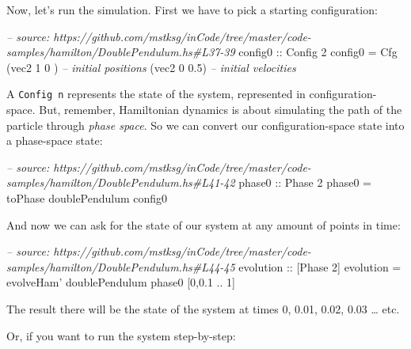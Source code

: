 \documentclass[]{article}
\newenvironment{Shaded}{}{}
\newcommand{\DataTypeTok}[1]{\textcolor[rgb]{0.56,0.13,0.00}{{#1}}}
\newcommand{\DecValTok}[1]{\textcolor[rgb]{0.25,0.63,0.44}{{#1}}}
\newcommand{\FloatTok}[1]{\textcolor[rgb]{0.25,0.63,0.44}{{#1}}}
\newcommand{\CommentTok}[1]{\textcolor[rgb]{0.38,0.63,0.69}{\textit{{#1}}}}
\newcommand{\OtherTok}[1]{\textcolor[rgb]{0.00,0.44,0.13}{{#1}}}
\newcommand{\FunctionTok}[1]{\textcolor[rgb]{0.02,0.16,0.49}{{#1}}}
\newcommand{\NormalTok}[1]{{#1}}
\begin{document}
Now, let's run the simulation. First we have to pick a starting configuration:

\begin{Shaded}
\begin{Highlighting}[]
\CommentTok{-- source: https://github.com/mstksg/inCode/tree/master/code-samples/hamilton/DoublePendulum.hs#L37-39}
\OtherTok{config0 ::} \DataTypeTok{Config} \DecValTok{2}
\NormalTok{config0 }\FunctionTok{=} \DataTypeTok{Cfg} \NormalTok{(vec2 }\DecValTok{1} \DecValTok{0}  \NormalTok{)  }\CommentTok{-- initial positions}
              \NormalTok{(vec2 }\DecValTok{0} \FloatTok{0.5}\NormalTok{)  }\CommentTok{-- initial velocities}
\end{Highlighting}
\end{Shaded}

A \texttt{Config\ n} represents the state of the system, represented in
configuration-space. But, remember, Hamiltonian dynamics is about simulating the
path of the particle through \emph{phase space}. So we can convert our
configuration-space state into a phase-space state:

\begin{Shaded}
\begin{Highlighting}[]
\CommentTok{-- source: https://github.com/mstksg/inCode/tree/master/code-samples/hamilton/DoublePendulum.hs#L41-42}
\OtherTok{phase0 ::} \DataTypeTok{Phase} \DecValTok{2}
\NormalTok{phase0 }\FunctionTok{=} \NormalTok{toPhase doublePendulum config0}
\end{Highlighting}
\end{Shaded}

And now we can ask for the state of our system at any amount of points in time:

\begin{Shaded}
\begin{Highlighting}[]
\CommentTok{-- source: https://github.com/mstksg/inCode/tree/master/code-samples/hamilton/DoublePendulum.hs#L44-45}
\OtherTok{evolution ::} \NormalTok{[}\DataTypeTok{Phase} \DecValTok{2}\NormalTok{]}
\NormalTok{evolution }\FunctionTok{=} \NormalTok{evolveHam' doublePendulum phase0 [}\DecValTok{0}\NormalTok{,}\FloatTok{0.1} \FunctionTok{..} \DecValTok{1}\NormalTok{]}
\end{Highlighting}
\end{Shaded}

The result there will be the state of the system at times 0, 0.01, 0.02, 0.03
\ldots{} etc.

Or, if you want to run the system step-by-step:
\end{document}
